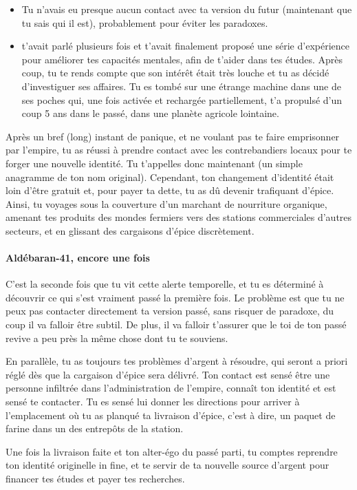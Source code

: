 {\begin{itemize}
		\item Tu n'avais eu presque aucun contact avec ta version du futur (maintenant que tu sais qui il est), probablement pour éviter les paradoxes.
		
		\item \nmPlayerI t'avait parlé plusieurs fois et t'avait finalement proposé une série d'expérience pour améliorer tes capacités mentales, afin de t'aider dans tes études. Après coup, tu te rends compte que son intérêt était très louche et tu as décidé d'investiguer ses affaires. Tu es tombé sur une étrange machine dans une de ses poches qui, une fois activée et rechargée partiellement, t'a propulsé d'un coup 5 ans dans le passé, dans une planète agricole lointaine.
	\end{itemize}
	
	\par Après un bref (long) instant de panique, et ne voulant pas te faire emprisonner par l'empire, tu as réussi à prendre contact avec les contrebandiers locaux pour te forger une nouvelle identité. Tu t'appelles donc maintenant \nmPlayerII (un simple anagramme de ton nom original). Cependant, ton changement d'identité était loin d'être gratuit et, pour payer ta dette, tu as dû devenir trafiquant d'épice. Ainsi, tu voyages sous la couverture d'un marchant de nourriture organique, amenant tes produits des mondes fermiers vers des stations commerciales d'autres secteurs, et en glissant des cargaisons d'épice discrètement.
	
	
	\paragraph{Aldébaran-41, encore une fois} C'est la seconde fois que tu vit cette alerte temporelle, et tu es déterminé à découvrir ce qui s'est vraiment passé la première fois. Le problème est que tu ne peux pas contacter directement ta version passé, sans risquer de paradoxe, du coup il va falloir être subtil. De plus, il va falloir t'assurer que le toi de ton passé revive a peu près la même chose dont tu te souviens.
	
	\par En parallèle, tu as toujours tes problèmes d'argent à résoudre, qui seront a priori réglé dès que la cargaison d'épice sera délivré. Ton contact est sensé être une personne infiltrée dans l'administration de l'empire, connaît ton identité et est sensé te contacter. Tu es sensé lui donner les directions pour arriver à l'emplacement où tu as planqué ta livraison d'épice, c'est à dire, un paquet de farine dans un des entrepôts de la station.
	
	\par Une fois la livraison faite et ton alter-égo du passé parti, tu comptes reprendre ton identité originelle in fine, et te servir de ta nouvelle source d'argent pour financer tes études et payer tes recherches.
}



